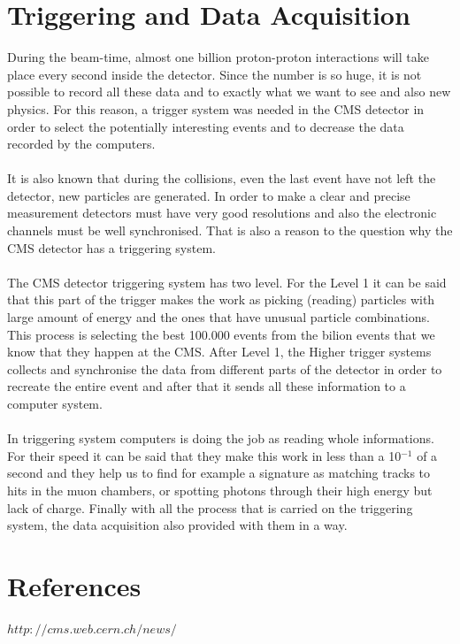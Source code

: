 \documentclass[11pt, oneside]{article}   	%
\begin{document}
\section{Triggering and Data Acquisition}

During the beam-time, almost one billion proton-proton interactions
will take place every second inside the detector. Since the number is so
huge, it is not possible to record all these data and to exactly what
we want to see and also new physics. For this reason, a trigger system was
needed in the CMS detector in order to select the potentially interesting
events and to decrease the data recorded by the computers.
\\\\
It is also known that during the collisions, even the last event have not
left the detector, new particles are generated. In order to make a clear
and precise measurement detectors must have very good resolutions and also
the electronic channels must be well synchronised. That is also a reason to the question 
why the CMS detector has a triggering system.
\\\\
The CMS detector triggering system has two level. For the Level 1
it can be said that this part of the trigger makes the work as picking
(reading) particles with large amount of energy and the ones that have unusual
particle combinations. This process is selecting the best 100.000 events
from the bilion events that we know that they happen at the CMS.
After Level 1, the Higher trigger systems collects and synchronise the
data from different parts of the detector in order to recreate the entire
event and after that it sends all these information to a computer system.
\\\\
In triggering system computers is doing the job as reading whole informations.
For their speed it can be said that they make this work in less than a 
10$^{-1}$ of a second and they help us to find for example a signature as
matching tracks to hits in the muon chambers, or spotting photons through their
high energy but lack of charge. Finally with all the process that is carried on
the triggering system, the data acquisition also provided with them in a way.

\clearpage
\section{References}
$http://cms.web.cern.ch/news/$
\end{document}
